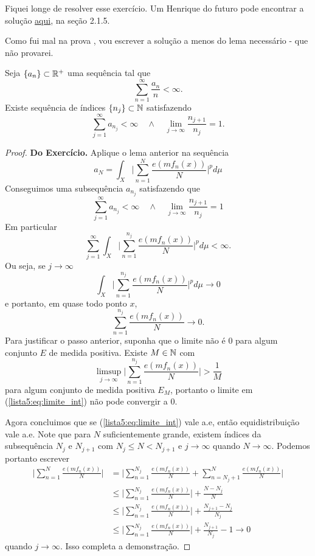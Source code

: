 \begin{problem}
    \label{prob:l5:4}
\end{problem}
\Frowny\;
Fiquei longe de resolver esse exercício. Um Henrique do futuro pode encontrar a solução \href{https://www.research-collection.ethz.ch/server/api/core/bitstreams/8ce179c7-da1f-4862-9404-cefb49d8e64e/content}{aqui},
na seção 2.1.5.

Como fui mal na prova \Frowny, vou escrever a solução a menos do lema necessário - que não provarei.
\begin{lemma}
    Seja $\{a_n\} \subset \mathbb{R}^+$ uma sequência tal que
    $$\sum_{n=1}^{\infty} \frac{a_n}{n} < \infty.$$
    Existe sequência de índices $\{n_j\} \subset \mathbb{N}$ satisfazendo 
    $$\sum_{j=1}^{\infty} a_{n_j} < \infty \quad \land \quad \lim_{j \to \infty} \frac{n_{j+1}}{n_j} = 1.$$ 
\end{lemma}

\begin{proof}
    \textbf{Do Exercício.} Aplique o lema anterior na sequência
    $$a_N = \int_X \bigg|\sum_{n=1}^{N} \frac{e(mf_n(x))}{N} \bigg|^p d\mu$$
    Conseguimos uma subsequência $a_{n_j}$ satisfazendo que 
    $$\sum_{j=1}^{\infty} a_{n_j} < \infty \quad \land \quad \lim_{j \to \infty} \frac{n_{j+1}}{n_j} = 1$$
    Em particular
    $$\sum_{j=1}^{\infty} \int_X \bigg|\sum_{n=1}^{n_j} \frac{e(mf_n(x))}{N} \bigg|^p d\mu < \infty.$$
    Ou seja, se $j \to \infty$
    \begin{equation}
        \label{lista5:eq:limite_int}
        \int_X \bigg|\sum_{n=1}^{n_j} \frac{e(mf_n(x))}{N} \bigg|^p d\mu \to 0
    \end{equation}
    e portanto, em quase todo ponto $x$, 
    $$\sum_{n=1}^{n_j} \frac{e(mf_n(x))}{N} \to 0.$$
    Para justificar o passo anterior, suponha que o limite não é $0$ para algum conjunto $E$ de medida positiva.
    Existe $M \in \mathbb{N}$ com 
    $$\limsup_{j\to\infty} \bigg|\sum_{n=1}^{n_j} \frac{e(mf_n(x))}{N}\bigg| > \frac{1}{M}$$
    para algum conjunto de medida positiva $E_M$, portanto o limite em (\ref{lista5:eq:limite_int}) não pode convergir a 0.

    Agora concluimos que se (\ref{lista5:eq:limite_int}) vale a.e, então equidistribuição vale a.e.
    Note que para $N$ suficientemente grande, existem índices da subsequência $N_j$ e $N_{j+1}$
    com $N_j \leq N < N_{j+1}$ e $j \to \infty$ quando $N \to \infty$. Podemos portanto escrever
    \begin{align*}
        \bigg|\sum_{n=1}^{N} \frac{e(mf_n(x))}{N}\bigg| &= \bigg|\sum_{n=1}^{N_j} \frac{e(mf_n(x))}{N} + \sum_{n=N_j + 1}^{N} \frac{e(mf_n(x))}{N} \bigg|\\
        &\leq \bigg|\sum_{n=1}^{N_j} \frac{e(mf_n(x))}{N}\bigg| + \frac{N - N_j}{N}\\
        &\leq \bigg|\sum_{n=1}^{N_j} \frac{e(mf_n(x))}{N}\bigg| + \frac{N_{j+1} - N_j}{N_j}\\
        &\leq \bigg|\sum_{n=1}^{N_j} \frac{e(mf_n(x))}{N}\bigg| + \frac{N_{j+1}}{N_j} - 1 \to 0
    \end{align*}
    quando $j \to \infty$. Isso completa a demonstração.

\end{proof}

